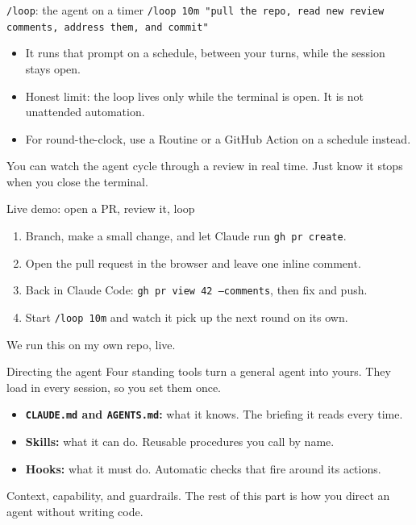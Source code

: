 \documentclass[aspectratio=169,11pt]{beamer}
\begin{document}
\begin{frame}{\texttt{/loop}: the agent on a timer}
\texttt{/loop 10m "pull the repo, read new review comments, address them, and commit"}
\vspace{0.35cm}
\begin{itemize}\setlength\itemsep{0.3em}
    \item It runs that prompt on a schedule, between your turns, while the session stays open.
    \item Honest limit: the loop lives only while the terminal is open. It is not unattended automation.
    \item For round-the-clock, use a Routine or a GitHub Action on a schedule instead.
\end{itemize}
\vspace{0.3cm}
\alert{You can watch the agent cycle through a review in real time. Just know it stops when you close the terminal.}
\end{frame}

\begin{frame}{Live demo: open a PR, review it, loop}
\begin{enumerate}\setlength\itemsep{0.25em}
    \item Branch, make a small change, and let Claude run \texttt{gh pr create}.
    \item Open the pull request in the browser and leave one inline comment.
    \item Back in Claude Code: \texttt{gh pr view 42 --comments}, then fix and push.
    \item Start \texttt{/loop 10m} and watch it pick up the next round on its own.
\end{enumerate}
\vspace{0.4cm}
\alert{We run this on my own repo, live.}
\end{frame}

\begin{frame}{Directing the agent}
Four standing tools turn a general agent into yours. They load in every session, so you set them once.
\vspace{0.45cm}
\begin{itemize}\setlength\itemsep{0.4em}
    \item \textbf{\texttt{CLAUDE.md} and \texttt{AGENTS.md}:} what it knows. The briefing it reads every time.
    \item \textbf{Skills:} what it can do. Reusable procedures you call by name.
    \item \textbf{Hooks:} what it must do. Automatic checks that fire around its actions.
\end{itemize}
\vspace{0.45cm}
\alert{Context, capability, and guardrails. The rest of this part is how you direct an agent without writing code.}
\end{frame}
\end{document}
